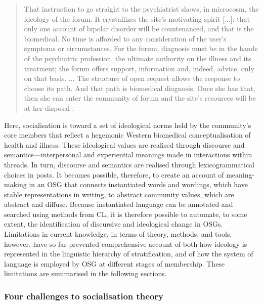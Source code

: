 \begin{quote}\small\singlespacing
That instruction to go straight to the psychiatrist shows, in microcosm, the ideology of the \gls{forum}. It crystallizes the site's motivating spirit [...]: that only one account of bipolar disorder will be countenanced, and that is the biomedical. No time is afforded to any consideration of the user's symptoms or circumstances. For the \gls{forum}, diagnosis must be in the hands of the psychiatric profession, the ultimate authority on the illness and its treatment; the forum offers support, information and, indeed, advice, only on that basis. ... The structure of open request allows the response to choose its path. And that path is biomedical diagnosis. Once she has that, then she can enter the community of \gls{forum}  and the site's resources will be at her disposal \parencite*[pp.~940--941]{vayreda_social_2009}.
\end{quote}
%
Here, socialisation is toward a set of ideological norms held by the community's core members that reflect a hegemonic Western biomedical conceptualisation of health and illness. These ideological values are realised through discourse and semantics---interpersonal and experiential meanings made in interactions within \glspl{thread}. In turn, discourse and semantics are realised through lexicogrammatical choices in  \glspl{post}. It becomes possible, therefore, to create an account of meaning\hyp{}making in an \gls{OSG} that connects instantiated words and wordings, which have stable representations in writing, to abstract community values, which are abstract and diffuse. Because instantiated language can be annotated and searched using methods from \gls{CL}, it is therefore possible to automate, to some extent, the identification of discursive and ideological change in \glspl{OSG}. Limitations in current knowledge, in terms of theory, methods, and tools, however, have so far prevented comprehensive account of both how ideology is represented in the linguistic hierarchy of stratification, and of how the system of language is employed by \gls{OSG}  at different stages of membership. These limitations are summarised in the following sections.

\subsubsection{Four challenges to socialisation theory}

